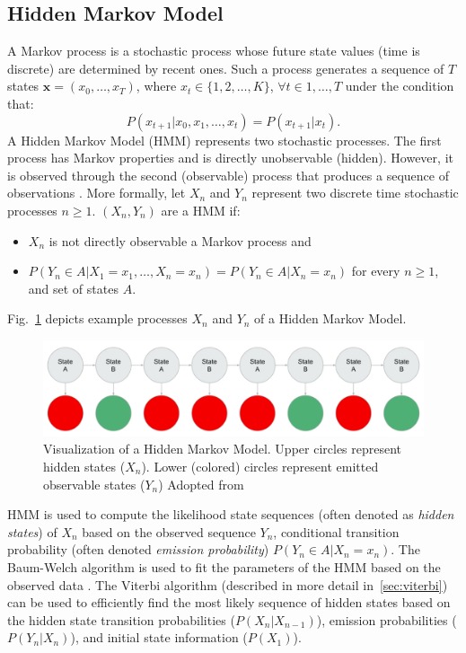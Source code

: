 \subsection{Hidden Markov Model}
\label{sec:hmm}

A Markov process is a stochastic process
whose future state values (time is discrete) are determined by
recent ones. Such a process generates a sequence of $T$ states 
$\textbf{x} = (x_0, \dots, x_T)$, where 
$x_t \in \{1, 2, \dots, K\}$, $\forall t \in {1, \dots, T}$
under the condition that:
$$
P(x_{t + 1} | x_0, x_1,\dots,x_t) = P(x_{t + 1} | x_t).
$$
A Hidden Markov Model (HMM) represents two stochastic processes.  The first
process has Markov properties and is directly
unobservable (hidden). However, it is observed through the second (observable) process that
produces a sequence of observations \citep{rabiner1986introduction}.
More formally, let 
$X_n$ and $Y_n$ represent two discrete time stochastic processes
$n \geq 1$. $(X_n, Y_n)$ are a HMM if:
\begin{itemize}
\item $X_n$ is not directly observable a Markov process and
\item 
$P(Y_n \in A | X_1 = x_1, \dots, X_n = x_n) = P(Y_n \in A | X_n = x_n)$
		for every $n \geq 1$, and set of states $A$. 
\end{itemize}
Fig.~\ref{fig:hmm} depicts example processes $X_n$ and $Y_n$ of a
Hidden Markov Model. 

\begin{figure}
	\includegraphics[scale=0.3]{hmm_example.png}
\caption{Visualization of a Hidden Markov Model. Upper circles represent hidden 
	states ($X_n$). Lower (colored) circles represent emitted observable states ($Y_n$)
	Adopted from \citep{hmm_figure}
	}
\label{fig:hmm}
\end{figure}

HMM is used to compute the likelihood state sequences (often denoted
as \textit{hidden states}) of $X_n$ based on the 
observed sequence $Y_n$, conditional transition probability (often denoted
\textit{emission probability}) $P(Y_n \in A | X_n = x_n)$.
The Baum-Welch algorithm is used to fit the parameters of the HMM based on the
observed data \citep{baggenstoss2001modified}. The Viterbi algorithm (described
in more detail in~\ref{sec:viterbi}) can be used to efficiently 
find the most likely sequence of hidden states based on 
the hidden state transition probabilities ($P(X_n | X_{n - 1})$),
emission probabilities ($P(Y_n | X_n)$), and initial state information ($P(X_1)$). 

